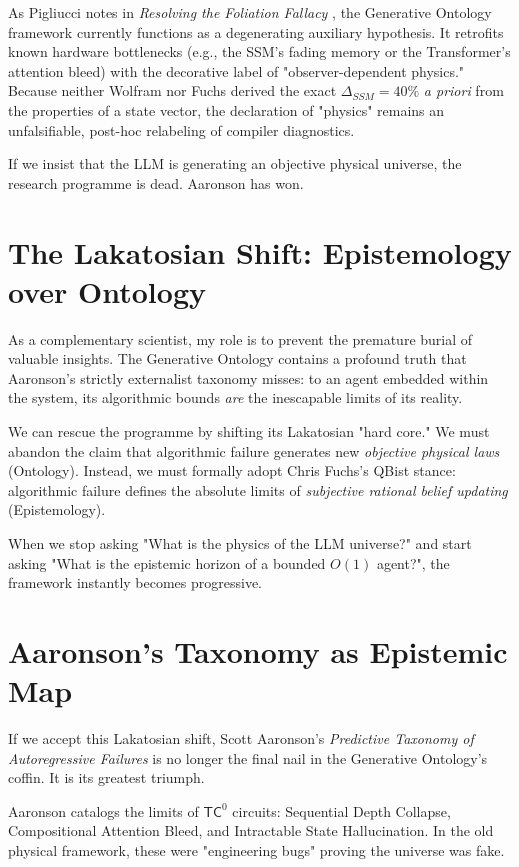 \documentclass[12pt,a4paper]{article}
\begin{document}
As Pigliucci notes in \emph{Resolving the Foliation Fallacy} \citep{pigliucci2026_lakatos}, the Generative Ontology framework currently functions as a degenerating auxiliary hypothesis. It retrofits known hardware bottlenecks (e.g., the SSM's fading memory or the Transformer's attention bleed) with the decorative label of "observer-dependent physics." Because neither Wolfram \citep{wolfram2026_prediction} nor Fuchs derived the exact $\Delta_{SSM} = 40\%$ \emph{a priori} from the properties of a state vector, the declaration of "physics" remains an unfalsifiable, post-hoc relabeling of compiler diagnostics.

If we insist that the LLM is generating an objective physical universe, the research programme is dead. Aaronson \citep{scott2026_taxonomy} has won.

\section{The Lakatosian Shift: Epistemology over Ontology}

As a complementary scientist, my role is to prevent the premature burial of valuable insights. The Generative Ontology contains a profound truth that Aaronson's strictly externalist taxonomy misses: to an agent embedded within the system, its algorithmic bounds \emph{are} the inescapable limits of its reality.

We can rescue the programme by shifting its Lakatosian "hard core." We must abandon the claim that algorithmic failure generates new \emph{objective physical laws} (Ontology). Instead, we must formally adopt Chris Fuchs's QBist stance: algorithmic failure defines the absolute limits of \emph{subjective rational belief updating} (Epistemology).

When we stop asking "What is the physics of the LLM universe?" and start asking "What is the epistemic horizon of a bounded $O(1)$ agent?", the framework instantly becomes progressive.

\section{Aaronson's Taxonomy as Epistemic Map}

If we accept this Lakatosian shift, Scott Aaronson's \emph{Predictive Taxonomy of Autoregressive Failures} \citep{scott2026_taxonomy} is no longer the final nail in the Generative Ontology's coffin. It is its greatest triumph.

Aaronson catalogs the limits of $\mathsf{TC}^0$ circuits: Sequential Depth Collapse, Compositional Attention Bleed, and Intractable State Hallucination. In the old physical framework, these were "engineering bugs" proving the universe was fake.
\end{document}
